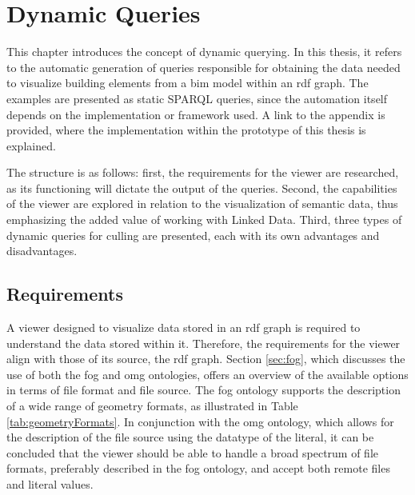 \chapter{Dynamic Queries} \label{ch:dynamicQueries}
This chapter introduces the concept of dynamic querying. In this thesis, it refers to the automatic generation of queries responsible for obtaining the data needed to visualize building elements from a \ac{bim} model within an \ac{rdf} graph. The examples are presented as static SPARQL queries, since the automation itself depends on the implementation or framework used. A link to the appendix is provided, where the implementation within the prototype of this thesis is explained.

The structure is as follows: first, the requirements for the viewer are researched, as its functioning will dictate the output of the queries. Second, the capabilities of the viewer are explored in relation to the visualization of semantic data, thus emphasizing the added value of working with Linked Data. Third, three types of dynamic queries for culling are presented, each with its own advantages and disadvantages.

\section{Requirements} \label{sec:viewerRequirements}
A viewer designed to visualize data stored in an \ac{rdf} graph is required to understand the data stored within it. Therefore, the requirements for the viewer align with those of its source, the \ac{rdf} graph. Section \ref{sec:fog}, which discusses the use of both the \ac{fog} and \ac{omg} ontologies, offers an overview of the available options in terms of file format and file source. The \ac{fog} ontology supports the description of a wide range of geometry formats, as illustrated in Table \ref{tab:geometryFormats}. In conjunction with the \ac{omg} ontology, which allows for the description of the file source using the datatype of the literal, it can be concluded that the viewer should be able to handle a broad spectrum of file formats, preferably described in the \ac{fog} ontology, and accept both remote files and literal values.

